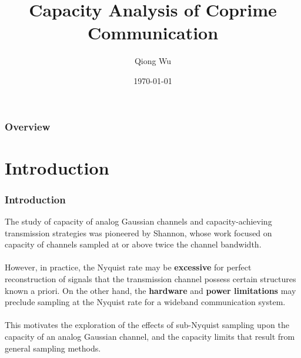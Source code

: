 \documentclass{beamer}
\title[Capacity Analysis of Coprime Communication]{Capacity Analysis of Coprime Communication} %
\author{Qiong Wu} %
\institute[UCLA] %
{
University of Texas at Arlington \\ %
Wireless Comm. and Networking Lab\\
\medskip
\textit{qiong.wu@mavs.uta.edu} %
}
\date{\today} %
\begin{document}
\begin{frame}
\titlepage %
\end{frame}

\begin{frame}
\frametitle{Overview} %
\tableofcontents %
\end{frame}


\section{Introduction} %



\begin{frame}
\frametitle{Introduction}
The study of capacity of analog Gaussian channels and capacity-achieving transmission strategies was pioneered by Shannon, whose work focused on capacity of channels sampled at or above twice the channel bandwidth.\\~\\

However, in practice, the Nyquist rate may be {\bf excessive} for perfect reconstruction of signals that the transmission channel possess certain structures known a priori. On the other hand, the {\bf hardware} and {\bf power limitations} may preclude sampling at the Nyquist rate for a wideband communication system.\\~\\

This motivates the exploration of the effects of sub-Nyquist sampling upon the capacity of an analog Gaussian channel, and the capacity limits that result from general sampling methods.
\end{frame}
\end{document}
